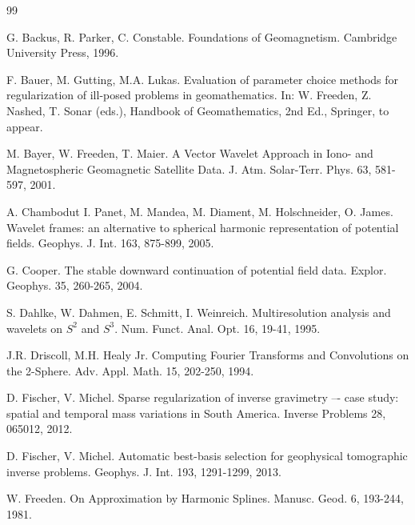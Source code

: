 \documentclass[a4paper, 10pt]{article}
\numberwithin{equation}{section}
\theoremstyle{definition}
\begin{document}
\begin{thebibliography}{99}

G. Backus, R. Parker, C. Constable. Foundations of Geomagnetism. Cambridge University Press, 1996.

F. Bauer, M. Gutting, M.A. Lukas. Evaluation of parameter choice methods for regularization of ill-posed problems in geomathematics. In: W. Freeden, Z. Nashed, T. Sonar (eds.), Handbook of Geomathematics, 2nd Ed., Springer, to appear.

M. Bayer, W. Freeden, T. Maier. A Vector Wavelet Approach in Iono- and Magnetospheric Geomagnetic Satellite Data. J. Atm. Solar-Terr. Phys. 63, 581-597, 2001. 


A. Chambodut I. Panet, M. Mandea, M. Diament, M. Holschneider, O. James. Wavelet frames: an alternative to spherical harmonic representation of potential fields. Geophys. J. Int. 163, 875-899, 2005.

G. Cooper. The stable downward continuation of potential field data. Explor. Geophys. 35, 260-265, 2004.

S. Dahlke, W. Dahmen, E. Schmitt, I. Weinreich. Multiresolution analysis and wavelets on $S^2$ and $S^3$. Num. Funct. Anal. Opt. 16, 19-41, 1995.


J.R. Driscoll, M.H. Healy Jr. Computing Fourier Transforms and Convolutions on the 2-Sphere. Adv. Appl. Math. {15}, 202-250, 1994.

D. Fischer, V. Michel. Sparse regularization of inverse gravimetry –- case study: spatial and temporal mass variations in South America. Inverse Problems 28, 065012, 2012.

D. Fischer, V. Michel. Automatic best-basis selection for geophysical tomographic inverse problems. Geophys. J. Int. 193, 1291-1299, 2013.

W. Freeden. On Approximation by Harmonic Splines. Manusc. Geod. {6}, 193-244, 1981. 


\end{thebibliography}
\end{document}
